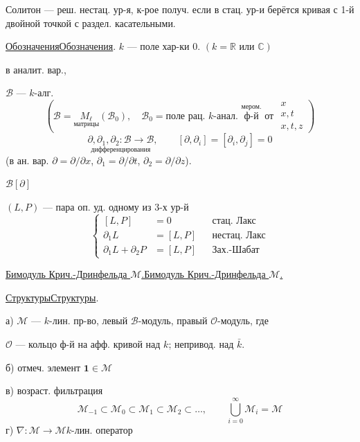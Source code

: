 \documentclass[11pt]{article}
\theoremstyle{definition}
\theoremstyle{remark}
\let\DiplomaticMathUnderline\underline
\renewcommand{\underline}[1]{\ifmmode\DiplomaticMathUnderline{#1}\else\uline{#1}\fi}
\begin{document}
Солитон — реш. нестац. ур-я, к-рое получ. если в стац. ур-и
берётся кривая с 1-й двойной точкой с раздел. касательными.

\underline{Обозначения}. $k$ — поле хар-ки 0.
$(k=\mathbb{R}\text{ или }\mathbb{C})$
\begin{flushright}
в аналит. вар.,
\end{flushright}
$\mathcal{B}$ — $k$-алг.
\begin{equation*}
\left(\mathcal{B}=\underset{\text{матрицы}}{M_{\ell}}(\mathcal{B}_{0}),\quad
\mathcal{B}_{0}=\text{поле рац. }k\text{-анал. }\overset{\text{мером.}}{\text{ф-й}}\text{ от }
\begin{matrix}x\\x,t\\x,t,z\end{matrix}\right)
\end{equation*}
\begin{equation*}
\underset{\text{дифференцирования}}{\partial,\partial_{1},\partial_{2}:\mathcal{B}\longrightarrow\mathcal{B}},
\qquad [\partial,\partial_{i}]=[\partial_{i},\partial_{j}]=0
\end{equation*}
(в ан. вар. $\partial=\partial/\partial x$, $\partial_{1}=\partial/\partial t$,
$\partial_{2}=\partial/\partial z$).

$\mathcal{B}[\partial]$

$(L,P)$ — пара оп. уд. одному из 3-х ур-й
\begin{equation*}
\left\{\begin{aligned}
[L,P]&=0 &&\text{стац. Лакс}\\
\partial_{1}L&=[L,P] &&\text{нестац. Лакс}\\
\partial_{1}L+\partial_{2}P&=[L,P] &&\text{Зах.-Шабат}
\end{aligned}\right.
\end{equation*}

\underline{Бимодуль Крич.-Дринфельда $\mathcal{M}$.}

\underline{Структуры}.

а) $\mathcal{M}$ — $k$-лин. пр-во, левый $\mathcal{B}$-модуль, правый $\mathcal{O}$-модуль, где

$\mathcal{O}$ — кольцо ф-й на афф. кривой над $k$; непривод. над $\bar{k}$.

б) отмеч. элемент $\mathbf{1}\in \mathcal{M}$

в) возраст. фильтрация
\begin{equation*}
\mathcal{M}_{-1}\subset \mathcal{M}_{0}\subset \mathcal{M}_{1}\subset \mathcal{M}_{2}\subset\ldots,
\qquad \bigcup_{i=0}^{\infty}\mathcal{M}_{i}=\mathcal{M}
\end{equation*}
г) $\nabla:\mathcal{M}\longrightarrow \mathcal{M}$\qquad $k$-лин. оператор
\end{document}
